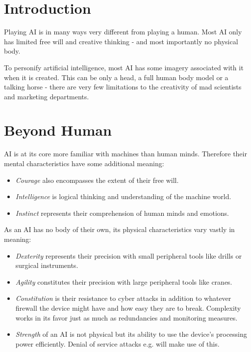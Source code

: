 \documentclass[12pt,a4paper,openany]{book}
\begin{document}
	

	\chapter{Introduction}
	Playing AI is in many ways very different from playing a human. Most AI only has limited free will and creative thinking - and most importantly no physical body.
	\par
	To personify artificial intelligence, most AI has some imagery associated with it when it is created. This can be only a head, a full human body model or a talking horse - there are very few limitations to the creativity of mad scientists and marketing departments.

	\chapter{Beyond Human}
	\vspace{-8mm} %
	AI is at its core more familiar with machines than human minds. Therefore their mental characteristics have some additional meaning:
	\vspace{-8mm}
	\begin{itemize}
		\setlength\itemsep{-8mm}
		\item \emph{Courage} also encompasses the extent of their free will.
		\item \emph{Intelligence} is logical thinking and understanding of the machine world.
		\item \emph{Instinct} represents their comprehension of human minds and emotions.
	\end{itemize}

	As an AI has no body of their own, its physical characteristics vary vastly in meaning:
	\vspace{-8mm}
	\begin{itemize}
		\setlength\itemsep{-8mm}
		\item \emph{Dexterity} represents their precision with small peripheral tools like drills or surgical instruments.
		\item \emph{Agility} constitutes their precision with large peripheral tools like cranes.
		\item \emph{Constitution} is their resistance to cyber attacks in addition to whatever firewall the device might have and how easy they are to break. Complexity works in its favor just as much as redundancies and monitoring measures.
		\item \emph{Strength} of an AI is not physical but its ability to use the device’s processing power efficiently. Denial of service attacks e.g. will make use of this.
	\end{itemize}
\end{document}
